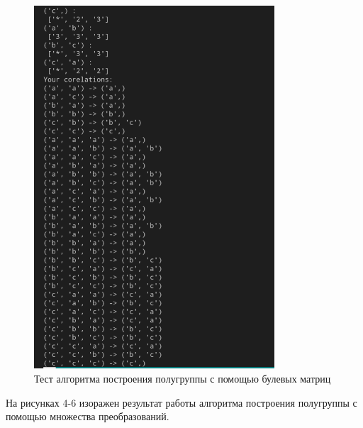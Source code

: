 \documentclass[bachelor, och, labwork]{shiza}
\begin{document}
      \begin{figure}[H]
        \centering
        \includegraphics[width=0.8\textwidth]{photo/3.png}
        \caption{Тест алгоритма построения полугруппы с помощью булевых матриц}
      \end{figure}

      На рисунках 4-6 изоражен результат работы алгоритма построения полугруппы с помощью множества преобразований.
\end{document}
